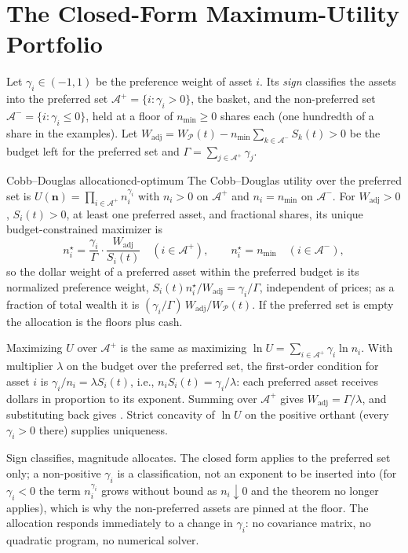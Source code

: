 \documentclass[11pt]{article}
\newcommand{\bn}{\mathbf n}
\newcommand{\Ap}{\mathcal A^{+}}
\newcommand{\Am}{\mathcal A^{-}}
\newcommand{\WP}{W_{\mathcal P}}
\newcommand{\Wadj}{W_{\mathrm{adj}}}
\begin{document}
\section{The Closed-Form Maximum-Utility Portfolio}

Let $\gamma_i\in(-1,1)$ be the preference weight of asset $i$. Its \emph{sign} classifies the assets into the preferred set $\Ap=\{i:\gamma_i>0\}$, the basket, and the non-preferred set $\Am=\{i:\gamma_i\le0\}$, held at a floor of $n_{\min}\ge0$ shares each (one hundredth of a share in the examples). Let $\Wadj=\WP(t)-n_{\min}\sum_{k\in\Am}S_k(t)>0$ be the budget left for the preferred set and $\Gamma=\sum_{j\in\Ap}\gamma_j$.

\begin{theorem}{Cobb--Douglas allocation}{cd-optimum}
The Cobb--Douglas utility over the preferred set is $U(\bn)=\prod_{i\in\Ap}n_i^{\gamma_i}$ with $n_i>0$ on $\Ap$ and $n_i=n_{\min}$ on $\Am$. For $\Wadj>0$, $S_i(t)>0$, at least one preferred asset, and fractional shares, its unique budget-constrained maximizer is
\begin{equation}
  \label{eq:cd-shares}
  n_i^\star=\frac{\gamma_i}{\Gamma}\cdot\frac{\Wadj}{S_i(t)}\quad(i\in\Ap),
  \qquad
  n_i^\star=n_{\min}\quad(i\in\Am),
\end{equation}
so the dollar weight of a preferred asset within the preferred budget is its normalized preference weight, $S_i(t)n_i^\star/\Wadj=\gamma_i/\Gamma$, independent of prices; as a fraction of total wealth it is $(\gamma_i/\Gamma)\,\Wadj/\WP(t)$. If the preferred set is empty the allocation is the floors plus cash.
\end{theorem}

\begin{derivation}
Maximizing $U$ over $\Ap$ is the same as maximizing $\ln U=\sum_{i\in\Ap}\gamma_i\ln n_i$. With multiplier $\lambda$ on the budget over the preferred set, the first-order condition for asset $i$ is $\gamma_i/n_i=\lambda S_i(t)$, i.e., $n_iS_i(t)=\gamma_i/\lambda$: each preferred asset receives dollars in proportion to its exponent. Summing over $\Ap$ gives $\Wadj=\Gamma/\lambda$, and substituting back gives . Strict concavity of $\ln U$ on the positive orthant (every $\gamma_i>0$ there) supplies uniqueness.
\end{derivation}

Sign classifies, magnitude allocates. The closed form applies to the preferred set only; a non-positive $\gamma_i$ is a classification, not an exponent to be inserted into  (for $\gamma_i<0$ the term $n_i^{\gamma_i}$ grows without bound as $n_i\downarrow0$ and the theorem no longer applies), which is why the non-preferred assets are pinned at the floor. The allocation responds immediately to a change in $\gamma_i$: no covariance matrix, no quadratic program, no numerical solver.
\end{document}
